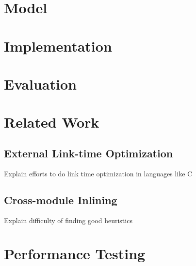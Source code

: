 \documentclass{llncs}
\begin{document}
\section{Model}

\section{Implementation}

\section{Evaluation}

\section{Related Work}
   \subsection{External Link-time Optimization}

   Explain efforts to do link time optimization in languages like C 
   
   \subsection{Cross-module Inlining}

   Explain difficulty of finding good heuristics

\section{Performance Testing}
  
\end{document}
